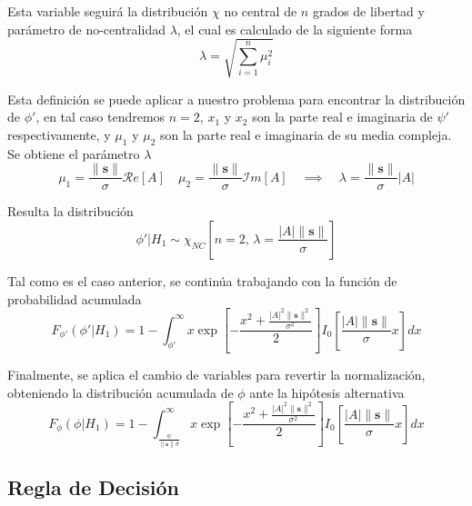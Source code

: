 Esta variable seguirá la distribución $\chi$ no central de $n$ grados de libertad y parámetro de no-centralidad $\lambda$, el cual es calculado de la siguiente forma
\begin{equation}
    \lambda = \sqrt{\sum_{i=1}^{n}\mu_i^2}
\end{equation}

Esta definición se puede aplicar a nuestro problema para encontrar la distribución de $\phi'$, en tal caso tendremos $n = 2$, $x_1$ y $x_2$ son la parte real e imaginaria de $\psi'$ respectivamente, y $\mu_1$ y $\mu_2$ son la parte real e imaginaria de su media compleja. Se obtiene el parámetro $\lambda$
\begin{equation}
    \displaystyle\mu_1 = \frac{\rVert\mathbf{s}\rVert}{\sigma}\mathcal{R}e\left[A\right] \quad \displaystyle\mu_2 = \frac{\rVert\mathbf{s}\rVert}{\sigma}\mathcal{I}m\left[A\right] \quad \implies \quad \lambda = \frac{\lVert\mathbf{s}\rVert}{\sigma}\lvert A \rvert
\end{equation}

Resulta la distribución
\begin{equation}
    \phi' | H_1 \sim \chi_{NC}\left[n = 2, \, \lambda = \frac{|A|\lVert\mathbf{s}\rVert}{\sigma}\right] 
\end{equation}

Tal como es el caso anterior, se continúa trabajando con la función de probabilidad acumulada
\begin{equation}
    F_{\phi'}(\phi'|H_1) = 1-\int_{\phi'}^\infty x\exp\left[-\frac{x^2 + \frac{|A|^2\lVert\mathbf{s}\rVert^2}{\sigma^2}}{2}\right]I_0\left[\frac{|A|\lVert\mathbf{s}\rVert}{\sigma} x\right] dx
\end{equation}

Finalmente, se aplica el cambio de variables para revertir la normalización, obteniendo la distribución acumulada de $\phi$ ante la hipótesis alternativa
\begin{equation}\label{eq:phi-ante-h1}
    F_\phi(\phi|H_1) = 1-\int_{\frac{\phi}{\lVert\mathbf{s}\rVert\sigma}}^\infty x\exp\left[-\frac{x^2 + \frac{|A|^2\lVert\mathbf{s}\rVert^2}{\sigma^2}}{2}\right]I_0\left[\frac{|A|\lVert\mathbf{s}\rVert}{\sigma} x\right] dx
\end{equation}

\subsection{Regla de Decisión}
\label{Ss:hipotesis-umbral}\label{eq:def-pfa}

